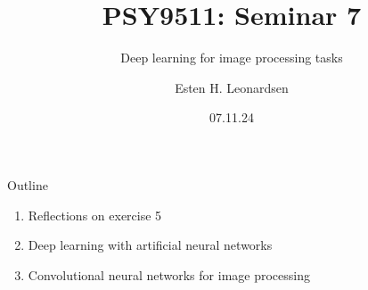 \documentclass[10pt]{beamer}
\title{PSY9511: Seminar 7}
\subtitle{Deep learning for image processing tasks}
\author{Esten H. Leonardsen}
\date{07.11.24}
\begin{document}
	\begin{frame}
	 	\maketitle
	\end{frame}

    \begin{frame}{Outline}
        \begin{enumerate}
            \item Reflections on exercise 5
            \item Deep learning with artificial neural networks
            \item Convolutional neural networks for image processing
        \end{enumerate}
    \end{frame}

    \def\nodesize{14pt}


    \newcommand{\highlightedneuron}[4]{
        \node[
            circle,
            draw=#4,
            fill=nodefill,
            minimum size=\nodesize,
            inner sep=0pt
        ] (#2) at #1 {};
    }

    \newcommand{\artificialneuron}[3]{
        \highlightedneuron{#1}{#2}{#3}{black}
    }

    \def\spacing{-0.1cm}

    
    
    
\end{document}
